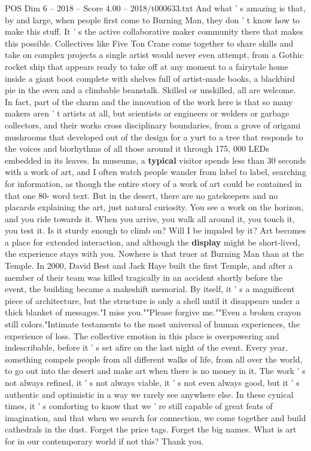 \begin{textsample}{POS Dim 6 – 2018 – Score 4.00 – 2018/t000633.txt}
And what ' s amazing is that, by and large, when people first come to Burning Man, they don ' t know how to make this stuff.
It ' s the active collaborative maker community there that makes this possible.
Collectives like Five Ton Crane come together to share skills and take on complex projects a single artist would never even attempt, from a Gothic rocket ship that appears ready to take off at any moment to a fairytale home inside a giant boot complete with shelves full of artist-made books, a blackbird pie in the oven and a climbable beanstalk.
Skilled or unskilled, all are welcome.
In fact, part of the charm and the innovation of the work here is that so many makers aren ' t artists at all, but scientists or engineers or welders or garbage collectors, and their works cross disciplinary boundaries, from a grove of origami mushrooms that developed out of the design for a yurt to a tree that responds to the voices and biorhythms of all those around it through 175, 000 LEDs embedded in its leaves.
In museums, a \textbf{typical} visitor spends less than 30 seconds with a work of art, and I often watch people wander from label to label, searching for information, as though the entire story of a work of art could be contained in that one 80- word text.
But in the desert, there are no gatekeepers and no placards explaining the art, just natural curiosity.
You see a work on the horizon, and you ride towards it.
When you arrive, you walk all around it, you touch it, you test it.
Is it sturdy enough to climb on?
Will I be impaled by it?
Art becomes a place for extended interaction, and although the \textbf{display} might be short-lived, the experience stays with you.
Nowhere is that truer at Burning Man than at the Temple.
In 2000, David Best and Jack Haye built the first Temple, and after a member of their team was killed tragically in an accident shortly before the event, the building became a makeshift memorial.
By itself, it ' s a magnificent piece of architecture, but the structure is only a shell until it disappears under a thick blanket of messages."I miss you.""Please forgive me.""Even a broken crayon still colors."Intimate testaments to the most universal of human experiences, the experience of loss.
The collective emotion in this place is overpowering and indescribable, before it ' s set afire on the last night of the event.
Every year, something compels people from all different walks of life, from all over the world, to go out into the desert and make art when there is no money in it.
The work ' s not always refined, it ' s not always viable, it ' s not even always good, but it ' s authentic and optimistic in a way we rarely see anywhere else.
In these cynical times, it ' s comforting to know that we ' re still capable of great feats of imagination, and that when we search for connection, we come together and build cathedrals in the dust.
Forget the price tags.
Forget the big names.
What is art for in our contemporary world if not this?
Thank you.

\end{textsample}
